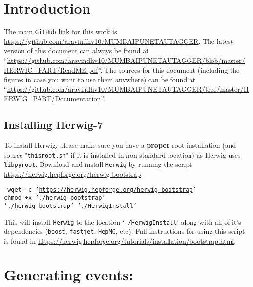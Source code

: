 \section{Introduction}
The main {\tt GitHub} link for this work is \url{https://github.com/aravindhv10/MUMBAIPUNETAUTAGGER}.
The latest version of this document can always be found at ``\url{https://github.com/aravindhv10/MUMBAIPUNETAUTAGGER/blob/master/HERWIG_PART/ReadME.pdf}''.
The sources for this document (including the figures in case you want to use them anywhere) can be found at ``\url{https://github.com/aravindhv10/MUMBAIPUNETAUTAGGER/tree/master/HERWIG_PART/Documentation}''.
\subsection{Installing Herwig-7}
To install Herwig, please make sure you have a {\bf proper} root installation (and source "{\tt thisroot.sh}" if it is installed in non-standard location) as Herwig uses {\tt libpyroot}.
Download and install {\tt Herwig} by running the script \url{https://herwig.hepforge.org/herwig-bootstrap}:
\begin{center}
    \begin{minipage}{0.7\textwidth}
        {\tt
            wget -c '\url{https://herwig.hepforge.org/herwig-bootstrap}'\\
            chmod +x './herwig-bootstrap'\\
            './herwig-bootstrap' './HerwigInstall'
        }
    \end{minipage}
\end{center}
This will install {\tt Herwig} to the location `{\tt ./HerwigInstall}' along with all of it's dependencies ({\tt boost}, {\tt fastjet}, {\tt HepMC}, etc).
Full instructions for using this script is found in \url{https://herwig.hepforge.org/tutorials/installation/bootstrap.html}.

\section{Generating events:}
